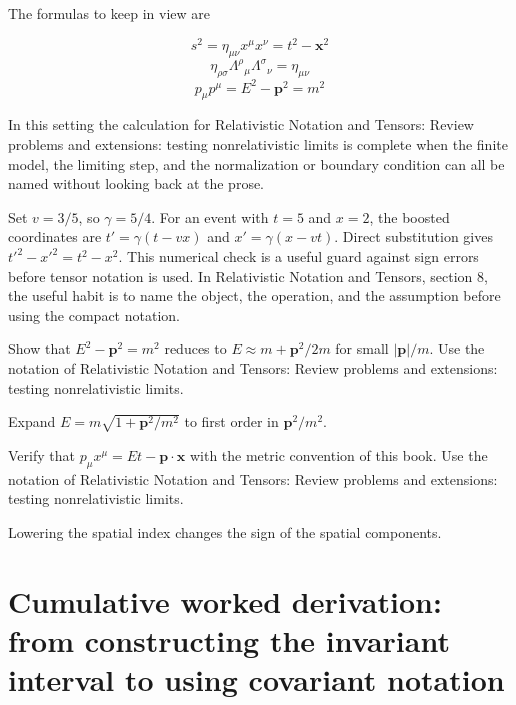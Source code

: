 The formulas to keep in view are

\[
  s^2=\eta_{\mu\nu}x^\mu x^\nu=t^2-\bm x^2
\]
\[
  \eta_{\rho\sigma}\Lambda^\rho{}_\mu\Lambda^\sigma{}_\nu=\eta_{\mu\nu}
\]
\[
  p_\mu p^\mu=E^2-\bm p^2=m^2
\]

In this setting the calculation for Relativistic Notation and Tensors: Review problems and extensions: testing nonrelativistic limits is complete when the finite model, the limiting step, and the normalization or boundary condition can all be named without looking back at the prose.




\begin{example}
Set \(v=3/5\), so \(\gamma=5/4\).  For an event with \(t=5\) and \(x=2\), the boosted coordinates are \(t'=\gamma(t-vx)\) and \(x'=\gamma(x-vt)\).  Direct substitution gives \(t'^2-x'^2=t^2-x^2\).  This numerical check is a useful guard against sign errors before tensor notation is used.  In Relativistic Notation and Tensors, section 8, the useful habit is to name the object, the operation, and the assumption before using the compact notation.
\end{example}



\begin{exercise}
Show that \(E^2-\bm p^2=m^2\) reduces to \(E\approx m+\bm p^2/2m\) for small \(|\bm p|/m\).  Use the notation of Relativistic Notation and Tensors: Review problems and extensions: testing nonrelativistic limits.
\begin{answer}
Expand \(E=m\sqrt{1+\bm p^2/m^2}\) to first order in \(\bm p^2/m^2\).
\end{answer}
\end{exercise}

\begin{exercise}
Verify that \(p_\mu x^\mu=Et-\bm p\cdot\bm x\) with the metric convention of this book.  Use the notation of Relativistic Notation and Tensors: Review problems and extensions: testing nonrelativistic limits.
\begin{answer}
Lowering the spatial index changes the sign of the spatial components.
\end{answer}
\end{exercise}



\section{Cumulative worked derivation: from constructing the invariant interval to using covariant notation}

